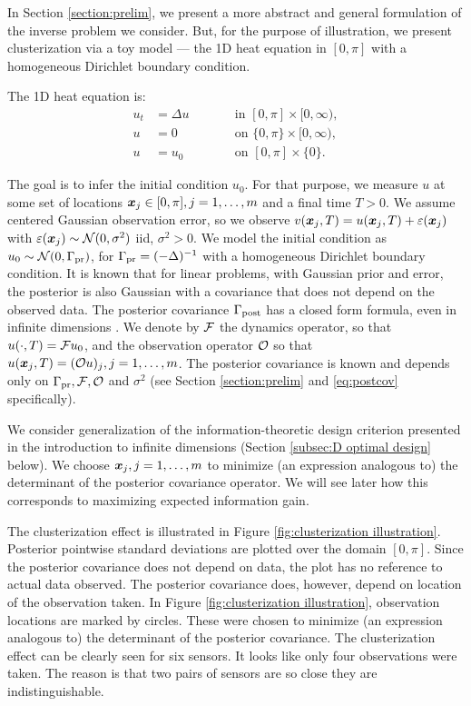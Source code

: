 In Section \ref{section:prelim}, we present a more abstract and general
formulation of the inverse problem we consider. But, for the purpose of
illustration, we present clusterization via a toy model --- the 1D heat
equation in $[0,\pi]$ with a homogeneous Dirichlet boundary condition.

The 1D heat equation is:
\begin{subequations}\label{eq:heat equation}
  \begin{alignat}{2}
    u_t &= \Delta u &&\qquad \text{in } [0,\pi] \times [0,\infty),\\
      u &= 0 &&\qquad \text{on } \{0, \pi\} \times [0,\infty),\\
        u &= u_0 &&\qquad \text{on }[0,\pi] \times \{0\}.
  \end{alignat}
\end{subequations}

The goal is to infer the initial condition $u_0$. For that purpose, we
measure $u$ at some set of locations ${\boldsymbol{x}}_j \in [0,\pi], j=1, \dots,m$
and a final time $T > 0$. We assume centered Gaussian observation
error, so we observe $v({\boldsymbol{x}}_j,T) = u({\boldsymbol{x}}_j,T) + \varepsilon({\boldsymbol{x}}_j)$ with
$\varepsilon({\boldsymbol{x}}_j) \sim \mathcal{N}(0, \sigma^2)$ iid, $\sigma^2 > 0$. We model
the initial condition as $u_0 \sim \mathcal{N}(0,\Gamma_{\textup{pr}})$, for $\Gamma_{\textup{pr}} =
(-\Delta)^{-1}$ with a homogeneous Dirichlet boundary condition. It is
known \cite{Tarantola05} that for linear problems, with Gaussian prior
and error, the posterior is also Gaussian with a covariance that does
not depend on the observed data. The posterior covariance $\Gamma_{\textup{post}}$
has a closed form formula, even in infinite dimensions
\cite{Stuart10}. We denote by $\mathcal{F}$ the dynamics operator, so that
$u( \cdot,T) = \mathcal{F} u_0$, and the observation operator $\mathcal{O}$ so that
$u({\boldsymbol{x}}_j,T) = (\mathcal{O} u)_j, j=1,\dots,m$. The posterior covariance is
known and depends only on $\Gamma_{\textup{pr}}, \mathcal{F}, \mathcal{O}$ and $\sigma^2$ (see
Section \ref{section:prelim} and \eqref{eq:postcov} specifically).

We consider generalization of the information-theoretic design
criterion presented in the introduction to infinite dimensions
(Section \ref{subsec:D optimal design} below). We choose
${\boldsymbol{x}}_j,j=1,\dots,m$ to minimize (an expression analogous to) the
determinant of the posterior covariance operator. We will see later
how this corresponds to maximizing expected information gain.

The clusterization effect is illustrated in Figure
\ref{fig:clusterization illustration}. Posterior pointwise standard
deviations are plotted over the domain $[0, \pi]$. Since the posterior
covariance does not depend on data, the plot has no reference to
actual data observed. The posterior covariance does, however, depend
on location of the observation taken. In Figure
\ref{fig:clusterization illustration}, observation locations are
marked by circles. These were chosen to minimize (an expression
analogous to) the determinant of the posterior covariance. The
clusterization effect can be clearly seen for six sensors. It looks
like only four observations were taken. The reason is that two pairs
of sensors are so close they are indistinguishable.


